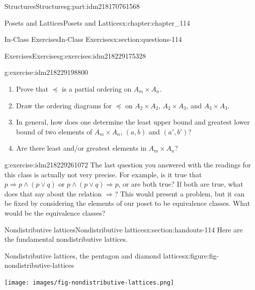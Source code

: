 \documentclass[oneside,10pt,]{book}
\numberwithin{equation}{section}
\begin{document}
\begin{partptx}{Structures}{}{Structures}{}{}{g:part:idm218170761568}
\begin{chapterptx}{Posets and Lattices}{}{Posets and Lattices}{}{}{x:chapter:chapter_114}
\begin{sectionptx}{In-Class Exercises}{}{In-Class Exercises}{}{}{x:section:questions-114}
\begin{exercises-subsection-numberless}{Exercises}{}{Exercises}{}{}{g:exercises:idm218229175328}
\begin{divisionexercise}{3}{}{}{g:exercise:idm218229198800}
\begin{equation*}
\end{equation*}
%
\begin{enumerate}[label=(\alph*)]
\item{}Prove that \(\preceq\) is a partial ordering on \(A_m \times  A_n\).%
\item{}Draw the ordering diagrams for \(\preceq\) on \(A_2 \times  A_2\), \(A_2\times  A_3\), and \(A_3 \times  A_3\).%
\item{}In general, how does one determine the least upper bound  and greatest lower bound of two elements of \(A_m \times  A_n\), \((a, b)\) and \((a',b')\)?%
\item{}Are there least and\slash{}or greatest elements in \(A_m \times  A_n\)?%
\end{enumerate}
%
\end{divisionexercise}%
\begin{divisionexercise}{4}{}{}{g:exercise:idm218229261072}%
The last question you answered with the readings for this class is actually not very precise.  For example,  is it true that  \(p \Rightarrow p\land(p \lor q)\) or  \(p\land(p \lor q) \Rightarrow p\), or are both true?  If both are true, what does that say about the relation \(\Rightarrow\)?   This would present a problem, but it can be fixed by considering the elements of our poset to be equivalence classes.  What would be the equivalence classes?%
\end{divisionexercise}%
\end{exercises-subsection-numberless}
\end{sectionptx}
%
%
\typeout{************************************************}
\typeout{************************************************}
%
\begin{sectionptx}{Nondistributive lattices}{}{Nondistributive lattices}{}{}{x:section:handouts-114}
%
Here are the fundamental nondistributive lattices.%
\begin{figureptx}{Nondistributive lattices, the pentagon and diamond lattices}{x:figure:fig-nondistributive-lattices}{}%
\begin{image}{0.25}{0.5}{0.25}%
\texttt{[image: images/fig-nondistributive-lattices.png]}
\end{image}%
\tcblower
\end{figureptx}%
\end{sectionptx}
\end{chapterptx}
%
\typeout{************************************************}

\end{partptx}
\end{document}
